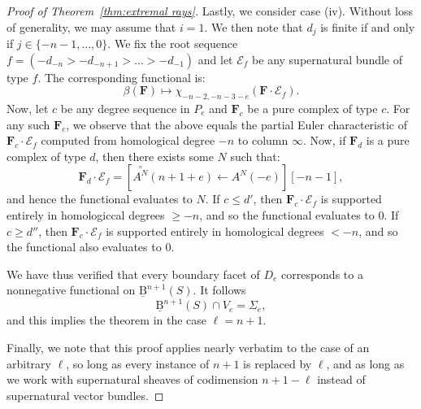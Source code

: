 \documentclass[12pt]{amsart}
\theoremstyle{definition}
\theoremstyle{remark}
\newcommand{\cE}{\mathcal{E}}
\newcommand{\FF}{\mathbf{F}}
\newcommand{\zp}{\circ}
\newcommand{\BBQ}{\underline{\mathrm{B}}}
\begin{document}
\begin{proof}[Proof of Theorem~\ref{thm:extremal rays}]
Lastly, we consider case (iv).  Without loss of generality, we may assume that $i=1$.  We then note that $d_j$ is finite if and only if $j\in \{-n-1,\dots ,0\}$.  We fix the root sequence $f=(-d_{-n}>-d_{-n+1}>\dots>-d_{-1})$ and let $\cE_f$ be any supernatural bundle of type $f$.   The corresponding functional is:
\[
\beta(\FF)\mapsto \chi_{-n-2,-n-3-e}(\FF\cdot \cE_f).
\]
Now, let $c$ be any degree sequence in $P_e$ and $\FF_c$ be a pure complex of type $c$.  For any such $\FF_c$, we observe that the above equals the partial Euler characteristic of $\FF_c\cdot \cE_f$ computed from homological degree $-n$ to column $\infty$.  Now, if $\FF_d$ is a pure complex of type $d$, then there exists some $N$ such that:
\[
\FF_d\cdot \cE_f=\left[ \overset{\zp}{A^N}(n+1+e)\gets A^N(-e) \right][-n-1],
\]
and hence the functional evaluates to $N$.  If $c\leq d'$, then $\FF_c\cdot \cE_f$ is supported entirely in homologiccal degrees $\geq -n$, and so the functional evaluates to $0$.  If $c\geq d''$, then $\FF_c\cdot \cE_f$ is supported entirely in homological degrees $<-n$, and so the functional also evaluates to $0$.


We have thus verified that every boundary facet of $D_e$ corresponds to a nonnegative functional on $\BBQ^{n+1}(S)$.  It follows 
\[
\BBQ^{n+1}(S)\cap V_e=\Sigma_e,
\]
and this implies the theorem in the case $\ell=n+1$.

Finally, we note that this proof applies nearly verbatim to the case of an arbitrary $\ell$, so long as every instance of $n+1$ is replaced by $\ell$, and as long as we work with supernatural sheaves of codimension $n+1-\ell$ instead of supernatural vector bundles.
\end{proof}
\end{document}

